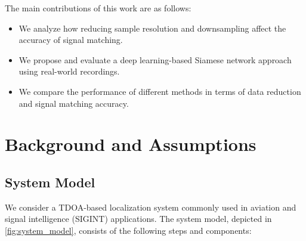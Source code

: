 \documentclass[sigconf, 10pt, nonacm, anonymous]{acmart}  %
\begin{document}
The main contributions of this work are as follows:
\begin{itemize}
    \item We analyze how reducing sample resolution and downsampling affect the accuracy of signal matching.
    \item We propose and evaluate a deep learning-based Siamese network approach using real-world recordings.
    \item We compare the performance of different methods in terms of data reduction and signal matching accuracy.
\end{itemize}

\section{Background and Assumptions}

\subsection{System Model}

We consider a TDOA-based localization system commonly used in aviation and signal intelligence (SIGINT) applications. The system model, depicted in \autoref{fig:system_model}, consists of the following steps and components:
\end{document}
